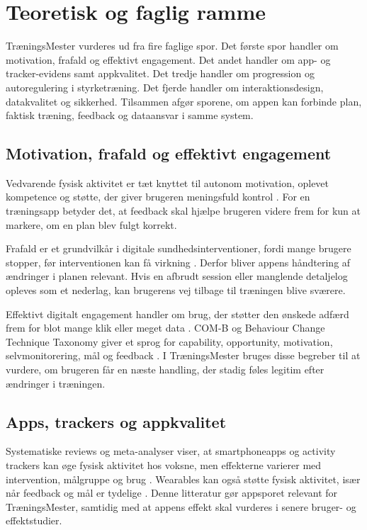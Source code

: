 \section{Teoretisk og faglig ramme}

TræningsMester vurderes ud fra fire faglige spor. Det første spor handler om motivation, frafald og effektivt engagement. Det andet handler om app- og tracker-evidens samt appkvalitet. Det tredje handler om progression og autoregulering i styrketræning. Det fjerde handler om interaktionsdesign, datakvalitet og sikkerhed. Tilsammen afgør sporene, om appen kan forbinde plan, faktisk træning, feedback og dataansvar i samme system.

\subsection{Motivation, frafald og effektivt engagement}

Vedvarende fysisk aktivitet er tæt knyttet til autonom motivation, oplevet kompetence og støtte, der giver brugeren meningsfuld kontrol \cite{teixeira2012_sdt_exercise}. For en træningsapp betyder det, at feedback skal hjælpe brugeren videre frem for kun at markere, om en plan blev fulgt korrekt.

Frafald er et grundvilkår i digitale sundhedsinterventioner, fordi mange brugere stopper, før interventionen kan få virkning \cite{eysenbach2005_law_of_attrition}. Derfor bliver appens håndtering af ændringer i planen relevant. Hvis en afbrudt session eller manglende detaljelog opleves som et nederlag, kan brugerens vej tilbage til træningen blive sværere.

Effektivt digitalt engagement handler om brug, der støtter den ønskede adfærd frem for blot mange klik eller meget data \cite{yardley2016_effective_engagement_dbci}. COM-B og Behaviour Change Technique Taxonomy giver et sprog for capability, opportunity, motivation, selvmonitorering, mål og feedback \cite{michie2011_behaviour_change_wheel,michie2013_bct_taxonomy_v1}. I TræningsMester bruges disse begreber til at vurdere, om brugeren får en næste handling, der stadig føles legitim efter ændringer i træningen.

\subsection{Apps, trackers og appkvalitet}

Systematiske reviews og meta-analyser viser, at smartphoneapps og activity trackers kan øge fysisk aktivitet hos voksne, men effekterne varierer med intervention, målgruppe og brug \cite{laranjo2021_apps_trackers_meta,romeo2019_smartphone_apps_pa_meta}. Wearables kan også støtte fysisk aktivitet, især når feedback og mål er tydelige \cite{brickwood2019_wearable_trackers_meta}. Denne litteratur gør appsporet relevant for TræningsMester, samtidig med at appens effekt skal vurderes i senere bruger- og effektstudier.

